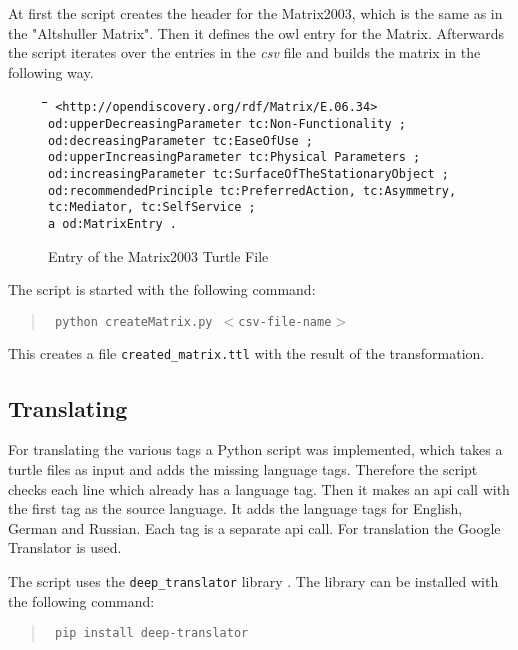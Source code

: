 \documentclass[11pt,a4paper]{article}
\newenvironment{code}{\tt \begin{tabbing}
\hskip12pt\=\hskip12pt\=\hskip12pt\=\hskip12pt\=\hskip5cm\=\hskip5cm\=\kill}
{\end{tabbing}}
\begin{document}
At first the script creates the header for the Matrix2003, which is the same
as in the "Altshuller Matrix".  Then it defines the owl entry for the Matrix.
Afterwards the script iterates over the entries in the \emph{csv} file and
builds the matrix in the following way.

\begin{figure}[ht]
  \centering
  \begin{code}\tt
    <http://opendiscovery.org/rdf/Matrix/E.06.34>\\
    \> od:upperDecreasingParameter tc:Non-Functionality ;\\
    \> od:decreasingParameter tc:EaseOfUse ;\\
    \> od:upperIncreasingParameter tc:Physical Parameters ;\\
    \> od:increasingParameter tc:SurfaceOfTheStationaryObject ;\\
    \> od:recommendedPrinciple tc:PreferredAction, tc:Asymmetry, \\
    \> \> \> tc:Mediator, tc:SelfService ;\\
    \> a od:MatrixEntry .
  \end{code}
  \caption{Entry of the Matrix2003 Turtle File}
\end{figure}

The script is started with the following command:
\begin{quote}\tt
    python createMatrix.py $<$csv-file-name$>$
\end{quote}
This creates a file \texttt{created\_matrix.ttl} with the result of the
transformation.

\subsection{Translating}

For translating the various tags a Python script was implemented, which takes
a turtle files as input and adds the missing language tags.  Therefore the
script checks each line which already has a language tag.  Then it makes an
api call with the first tag as the source language.  It adds the language tags
for English, German and Russian.  Each tag is a separate api call.  For
translation the Google Translator is used.

The script uses the \texttt{deep\_translator} library \cite{deep_translator}. 
The library can be installed with the following command:
\begin{quote}\tt
    pip install deep-translator
\end{quote}
\end{document}
